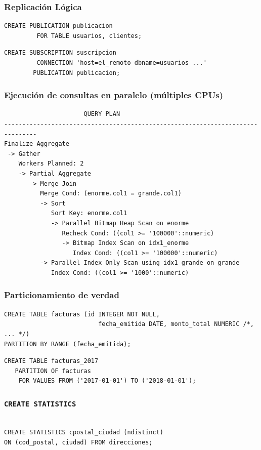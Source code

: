 \begin{frame}[fragile]
\frametitle{Replicación Lógica}

\begin{lstlisting}
CREATE PUBLICATION publicacion
         FOR TABLE usuarios, clientes;
\end{lstlisting}
\pause

\begin{lstlisting}
CREATE SUBSCRIPTION suscripcion
         CONNECTION 'host=el_remoto dbname=usuarios ...'
        PUBLICATION publicacion;
\end{lstlisting}
\end{frame}

\begin{frame}[fragile]
\frametitle{Ejecución de consultas en paralelo (múltiples CPUs)}

\footnotesize
\begin{lstlisting}
                      QUERY PLAN
-------------------------------------------------------------------------------
Finalize Aggregate
 -> Gather
    Workers Planned: 2
    -> Partial Aggregate
       -> Merge Join
          Merge Cond: (enorme.col1 = grande.col1)
          -> Sort
             Sort Key: enorme.col1
             -> Parallel Bitmap Heap Scan on enorme
                Recheck Cond: ((col1 >= '100000'::numeric) 
                -> Bitmap Index Scan on idx1_enorme 
                   Index Cond: ((col1 >= '100000'::numeric) 
          -> Parallel Index Only Scan using idx1_grande on grande
             Index Cond: ((col1 >= '1000'::numeric)

\end{lstlisting}
\end{frame}

\begin{frame}[fragile]
\frametitle{Particionamiento de verdad}

\footnotesize
\begin{lstlisting}
CREATE TABLE facturas (id INTEGER NOT NULL,
                          fecha_emitida DATE, monto_total NUMERIC /*, ... */)
PARTITION BY RANGE (fecha_emitida);
\end{lstlisting}

\pause
\begin{lstlisting}
CREATE TABLE facturas_2017
   PARTITION OF facturas
    FOR VALUES FROM ('2017-01-01') TO ('2018-01-01');
\end{lstlisting}
\end{frame}

\begin{frame}[fragile]
\frametitle{\texttt{CREATE STATISTICS}}

\begin{lstlisting}

CREATE STATISTICS cpostal_ciudad (ndistinct)
ON (cod_postal, ciudad) FROM direcciones;

\end{lstlisting}
\end{frame}

